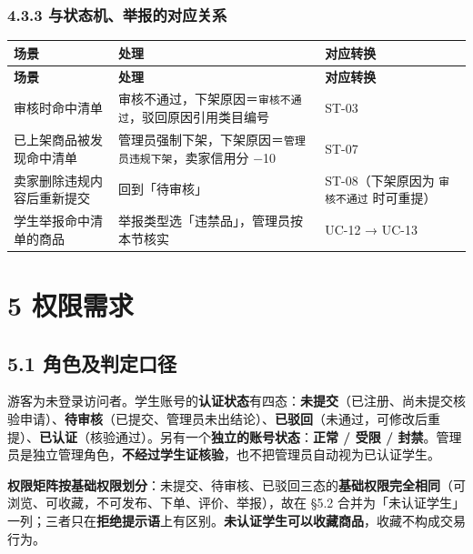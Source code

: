 \documentclass[12pt,a4paper]{ctexart}
\begin{document}
\subsubsection*{4.3.3 与状态机、举报的对应关系}

{\footnotesize
\begin{longtable}{|p{3.92cm}|p{6.82cm}|p{5.26cm}|}
\hline
\textbf{场景} & \textbf{处理} & \textbf{对应转换} \\
\hline
\endfirsthead
\hline
\textbf{场景} & \textbf{处理} & \textbf{对应转换} \\
\hline
\endhead
\hline
\endfoot
审核时命中清单 & 审核不通过，下架原因＝\texttt{审核不通过}，驳回原因引用类目编号 & ST-03 \\
\hline
已上架商品被发现命中清单 & 管理员强制下架，下架原因＝\texttt{管理员违规下架}，卖家信用分 −10 & ST-07 \\
\hline
卖家删除违规内容后重新提交 & 回到「待审核」 & ST-08（下架原因为 \texttt{审核不通过} 时可重提） \\
\hline
学生举报命中清单的商品 & 举报类型选「违禁品」，管理员按本节核实 & UC-12 → UC-13 \\
\hline
\end{longtable}
}




\section*{5 权限需求}

\subsection*{5.1 角色及判定口径}

游客为未登录访问者。学生账号的\textbf{认证状态}有四态：\textbf{未提交}（已注册、尚未提交核验申请）、\textbf{待审核}（已提交、管理员未出结论）、\textbf{已驳回}（未通过，可修改后重提）、\textbf{已认证}（核验通过）。另有一个\textbf{独立的账号状态}：\textbf{正常 / 受限 / 封禁}。管理员是独立管理角色，\textbf{不经过学生证核验}，也不把管理员自动视为已认证学生。


\textbf{权限矩阵按基础权限划分}：未提交、待审核、已驳回三态的\textbf{基础权限完全相同}（可浏览、可收藏，不可发布、下单、评价、举报），故在 §5.2 合并为「未认证学生」一列；三者只在\textbf{拒绝提示语}上有区别。\textbf{未认证学生可以收藏商品}，收藏不构成交易行为。
\end{document}

